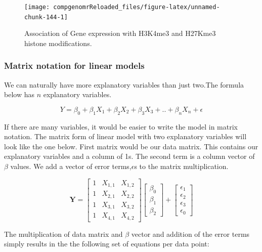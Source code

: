 \documentclass[12pt,]{krantz}
\theoremstyle{definition}
\theoremstyle{definition}
\theoremstyle{definition}
\theoremstyle{remark}
\begin{document}
\begin{figure}

{\centering \texttt{[image: compgenomrReloaded\_files/figure-latex/unnamed-chunk-144-1]} 

}

\caption{Association of Gene expression with H3K4me3 and H27Kme3 histone modifications.}\label{fig:unnamed-chunk-144}
\end{figure}

\hypertarget{matrix-notation-for-linear-models}{%
\subsubsection{Matrix notation for linear
models}\label{matrix-notation-for-linear-models}}

We can naturally have more explanatory variables than just two.The
formula below has \(n\) explanatory variables.

\[Y= \beta_0+\beta_1X_1+\beta_2X_2 +  \beta_3X_3 + .. + \beta_nX_n +\epsilon\]

If there are many variables, it would be easier to write the model in
matrix notation. The matrix form of linear model with two explanatory
variables will look like the one below. First matrix would be our data
matrix. This contains our explanatory variables and a column of 1s. The
second term is a column vector of \(\beta\) values. We add a vector of
error terms,\(\epsilon\)s to the matrix multiplication.

\[
 \mathbf{Y} = \left[\begin{array}{rrr}
1 & X_{1,1} & X_{1,2} \\
1 & X_{2,1} & X_{2,2} \\
1 & X_{3,1} & X_{3,2} \\
1 & X_{4,1} & X_{4,2}
\end{array}\right]
%
\left[\begin{array}{rrr}
\beta_0 \\
\beta_1 \\
\beta_2 
\end{array}\right]
% 
+
\left[\begin{array}{rrr}
\epsilon_1 \\
\epsilon_2 \\ 
\epsilon_3 \\ 
\epsilon_0
\end{array}\right]
\]

The multiplication of data matrix and \(\beta\) vector and addition of
the error terms simply results in the the following set of equations per
data point:
\end{document}
